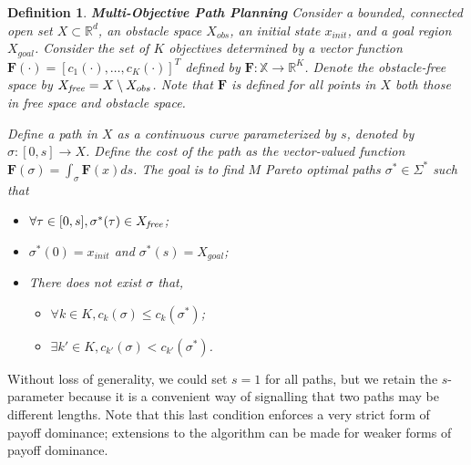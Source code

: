 \documentclass{article}
\newtheorem{defn}{Definition}
\begin{document}
\begin{defn}{ \textbf{Multi-Objective Path Planning} }
Consider a bounded, connected open set $ X \subset \mathbb{R}^{d} $, an obstacle space $ X_{obs} $, an initial state $ x_{init} $, and a goal region $ X_{goal} $. 
Consider the set of $K$ objectives determined by a vector function $ \bm{F}(\cdot) = [ c_{1} (\cdot), \ldots , c_{K}(\cdot) ]^{T}$ defined by $\bm{F}: \mathbb X \rightarrow \mathbb{R}^{K} $. 
Denote the obstacle-free space by $ X_{\it free} = X \setminus X_{obs} $. Note that $\bm{F}$ is defined for all points in $X$ both those in free space and obstacle space.

Define a {\em path} in $X$ as a continuous curve parameterized by $s$, denoted by $\sigma : [0,s] \rightarrow X$. 
Define the cost of the path as the vector-valued function $ \bm{F}(\sigma) = \int_{\sigma} \bm{F}(x)ds $.  
The goal is to find $ M $ Pareto optimal paths $ \sigma^{*} \in \Sigma^{*}$ such that
\begin{itemize}
	\item $\forall \tau\in[0,s], \sigma^*(\tau) \in X_{\it free}$;
	\item $ \sigma^{*} (0) = x_{init} $ and $ \sigma^{*} (s) = X_{goal}  $;
	\item There does not exist $ \sigma $ that,
	\begin{itemize}
		\item $ \forall k \in K, c_{k} (\sigma) \leq c_{k} (\sigma^{*}) $;
		\item $ \exists k' \in K, c_{k'} (\sigma) < c_{k'} (\sigma^{*}) $.
	\end{itemize}
\end{itemize}
\end{defn}
\noindent Without loss of generality, we could set $s=1$ for all paths, but we retain the $s$-parameter because it is a convenient way of signalling that two paths may be different lengths.  Note that this last condition enforces a very strict form of payoff dominance; extensions to the algorithm can be made for weaker forms of payoff dominance.
\end{document}
